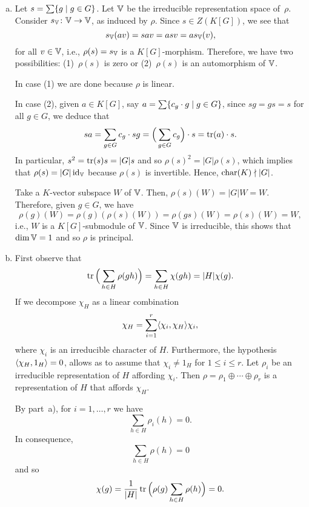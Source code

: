 \begin{solution}
    \begin{enumerate}[a)]
        \item Let $s=\sum\{g\mid g\in G\}$. Let $\mathbb V$ be the irreducible representation space of~$\rho$. Consider $s_\mathbb V\colon\mathbb V\to\mathbb V$, as induced by $\rho$. Since $s\in Z(K[G])$, we see that
        $$
            s_\mathbb V(av) = sav = asv = as_\mathbb V(v),
        $$
        for all $v\in\mathbb V$, i.e., $\rho(s)=s_\mathbb V$ is a $K[G]$-morphism. Therefore, we have two possibilities: (1)~$\rho(s)$ is zero or (2)~$\rho(s)$ is an automorphism of $\mathbb V$.
        
        In case (1) we are done because $\rho$ is linear.

        In case (2), given $a\in K[G]$, say $a=\sum\{c_g\cdot g\mid g\in G\}$, since $sg=gs=s$ for all $g\in G$, we deduce that
        $$
            sa = \sum_{g\in G}c_g\cdot sg
                = \Big(\sum_{g\in G}c_g\Big)\cdot s
                = \operatorname{tr}(a)\cdot s.
        $$
        In particular, $s^2=\operatorname{tr}(s)s=|G|s$ and so $\rho(s)^2=|G|\rho(s)$, which implies that $\rho(s)=|G|\operatorname{id}_\mathbb V$ because $\rho(s)$ is invertible. Hence, $\operatorname{char}(K)\nmid|G|$.
        
        Take a $K$-vector subspace $W$ of $\mathbb V$. Then, $\rho(s)(W)=|G|W=W$. Therefore, given $g\in G$, we have
        $$
            \rho(g)(W)=\rho(g)(\rho(s)(W)) = \rho(gs)(W)=\rho(s)(W)=W,
        $$
        i.e., $W$ is a $K[G]$-submodule of $\mathbb V$. Since $\mathbb V$ is irreducible, this shows that $\dim\mathbb V=1$ and so $\rho$ is principal.

        \item First observe that
        $$
            \operatorname{tr}\Big(\sum_{h\in H}\rho(gh)\Big)
                = \sum_{h\in H}\chi(gh)
                = |H|\chi(g).
        $$
        If we decompose $\chi_H$ as a linear combination
        $$
            \chi_H = \sum_{i=1}^r\langle\chi_i,\chi_H\rangle\chi_i,
        $$
        where $\chi_i$ is an irreducible character of $H$. Furthermore, the hypothesis $\langle\chi_H,1_H\rangle=0$, allows as to assume that $\chi_i\ne1_H$ for $1\le i\le r$. Let $\rho_i$ be an irreducible representation of $H$ affording $\chi_i$. Then $\rho=\rho_1\oplus\cdots\oplus\rho_r$ is a representation of $H$ that affords $\chi_H$.

        By part~a), for $i=1,\dots,r$ we have
        $$
            \sum_{h\in H}\rho_i(h) = 0.
        $$
        In consequence,
        $$
            \sum_{h\in H}\rho(h) = 0
        $$
        and so
        $$
            \chi(g) = \frac1{|H|}\operatorname{tr}\Big(\rho(g)
                \sum_{h\in H} \rho(h)\Big)
            = 0.
        $$
    \end{enumerate}
\end{solution}

